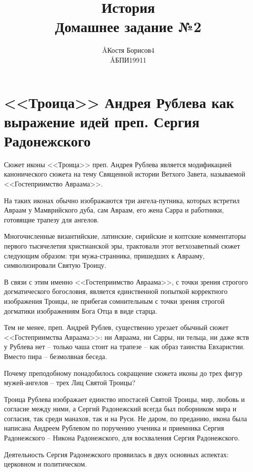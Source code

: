 \documentclass[12pt]{article}
\title{История \\ Домашнее задание №2}
\author{\AA{Костя Борисов}{4} \\ \AA{БПИ199}{11}}
\begin{document}
  \maketitle

  \setcounter{section}{2}
  \section{<<Троица>> Андрея Рублева как выражение идей преп. Сергия Радонежского}
  Сюжет иконы <<Троица>> преп. Андрея Рублева является модификацией канонического сюжета на тему Священной истории Ветхого Завета,
  называемой <<Гостеприимство Авраама>>.

  На таких иконах обычно изображаются три ангела-путника,
  которых встретил Авраам у Мамврийского дуба, сам Авраам, его жена Сарра
  и работники, готовящие трапезу для ангелов.

  Многочисленные византийские, латинские, сирийские и коптские комментаторы первого тысячелетия христианской эры,
  трактовали этот ветхозаветный сюжет следующим образом:
  три мужа-странника, пришедших к Аврааму, символизировали Святую Троицу.

  В связи с этим именно <<Гостеприимство Авраама>>, с точки зрения строгого догматического богословия,
  является единственной попыткой корректного изображения Троицы,
  не прибегая сомнительным с точки зрения строгой догматики изображениям Бога Отца в виде старца.

  Тем не менее, преп. Андрей Рублев, существенно урезает обычный сюжет <<Гостеприимства Авраама>>:
  ни Авраама, ни Сарры, ни тельца, ни даже яств у Рублева нет -- только чаша стоит на трапезе -- как образ таинства Евхаристии.
  Вместо пира -- безмолвная беседа.

  Почему преподобному понадобилось сокращение сюжета иконы до трех фигур мужей-ангелов -- трех Лиц Святой Троицы?

  Троица Рублева изображает единство ипостасей Святой Троицы, мир, любовь и согласие между ними,
  а Сергий Радонежский всегда был поборником мира и согласия, так среди манахов, так и на Руси.
  Не даром, по преданию, икона была написана Андреем Рублевом по поручению ученика и приемника Сергия Радонежского -- Никона Радонежского,
  для восхваления Сергия Радонежского.

  Деятельность Сергия Радонежского проявилась в двух основных аспектах: церковном и политическом.
\end{document}
